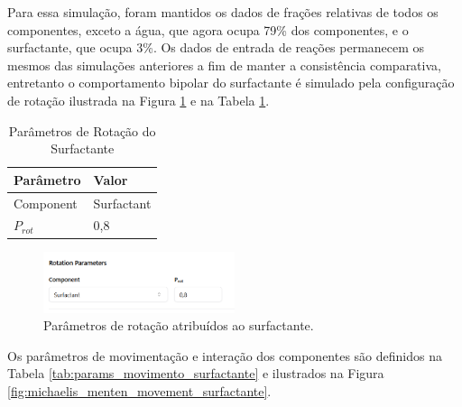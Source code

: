 \documentclass[12pt,oneside]{report}
\begin{document}
Para essa simulação, foram mantidos os dados de frações relativas de todos os componentes, exceto a água, que agora ocupa 79\% dos componentes, e o surfactante, que ocupa 3\%. Os dados de entrada de reações permanecem os mesmos das simulações anteriores a fim de manter a consistência comparativa, entretanto o comportamento bipolar do surfactante é simulado pela configuração de rotação ilustrada na Figura \ref{fig:rotation_surfactant} e na Tabela \ref{tab:rotation_surfactant}.

\begin{table}[H]
    \centering
    \caption{Parâmetros de Rotação do Surfactante}
    \vspace{0.2cm}
    \begin{tabularx}{\textwidth}{X m{5cm}}
        \hline
        \textbf{Parâmetro} & \textbf{Valor} \\
        \hline
        Component          & Surfactant     \\
        $P_{rot}$          & 0{,}8          \\
        \hline
    \end{tabularx}
    \vspace{0.2cm}
    \label{tab:rotation_surfactant}
\end{table}

\begin{figure}[H]
    \centering
    \includegraphics[width=0.5\textwidth]{rotation_surfactant.png}
    \caption{\small Parâmetros de rotação atribuídos ao surfactante.}
    \label{fig:rotation_surfactant}
\end{figure}

Os parâmetros de movimentação e interação dos componentes são definidos na Tabela \ref{tab:params_movimento_surfactante} e ilustrados na Figura \ref{fig:michaelis_menten_movement_surfactante}.
\end{document}
